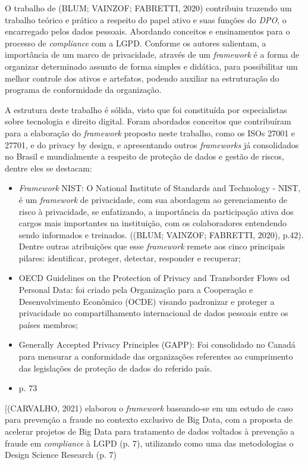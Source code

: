 \documentclass[
	12pt,				%
	openright,			%
	oneside,			%
	a4paper,			%
	english,			%
	french,				%
	spanish,			%
	brazil,				%
	]{abntex2}
\begin{document}
O trabalho de (BLUM; VAINZOF; FABRETTI, 2020) contribuiu trazendo um trabalho teórico e prático a respeito do papel ativo e suas funções do \textit{DPO}, o encarregado pelos dados pessoais. Abordando conceitos e ensinamentos para o processo de \textit{compliance} com a LGPD. Conforme os autores salientam, a importância de um marco de privacidade, através de um \textit{framework} é a forma de organizar determinado assunto de forma simples e didática, para possibilitar um melhor controle dos ativos e artefatos, podendo auxiliar na estruturação do programa de conformidade da organização.

A estrutura deste trabalho é sólida, visto que foi constituída por especialistas sobre tecnologia e direito digital. Foram abordados conceitos que contribuíram para a elaboração do \textit{framework} proposto neste trabalho, como os ISOs 27001 e 27701, e do privacy by design, e apresentando outros \textit{frameworks} já consolidados no Brasil e mundialmente a respeito de proteção de dados e gestão de riscos, dentre eles se destacam:

\begin{itemize}
\item \textit{Framework} NIST: O National Institute of Standards and Technology - NIST, é um \textit{framework} de privacidade, com sua abordagem ao gerenciamento de risco à privacidade, se enfatizando, a importância da participação ativa dos cargos mais importantes na instituição, com os colaboradores entendendo sendo informados e treinados. ((BLUM; VAINZOF; FABRETTI, 2020), p.42). Dentre outras atribuições que esse \textit{framework} remete aos cinco principais pilares: identificar, proteger, detectar, responder e recuperar; 
\item OECD Guidelines on the Protection of Privacy and Transborder Flows od Personal Data: foi criado pela Organização para a Cooperação e Desenvolvimento Econômico (OCDE) visando padronizar e proteger a privacidade no compartilhamento internacional de dados pessoais entre os países membros;
\item Generally Accepted Privacy Principles (GAPP): Foi consolidado no Canadá para mensurar a conformidade das organizações referentes ao cumprimento das legislações de proteção de dados do referido país. 
\item p. 73
\end{itemize}

[(CARVALHO, 2021) elaborou o \textit{framework}  baseando-se em um estudo de caso para prevenção a fraude no contexto exclusivo de Big Data, com a proposta de acelerar projetos de Big Data para tratamento de dados voltados à prevenção a fraude em \textit{compliance} à LGPD (p. 7), utilizando como uma das metodologias o Design Science Research (p. 7) 
\end{document}
